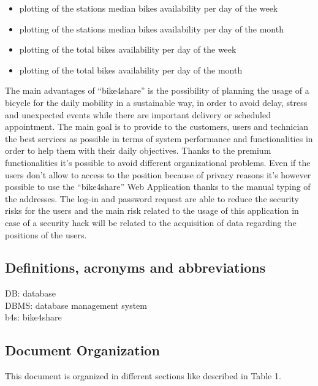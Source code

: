 \documentclass{article}
\begin{document}
\begin{itemize}
   \item plotting of the stations median bikes availability per day of the week
   \item plotting of the stations median bikes availability per day of the month
   \item plotting of the total bikes availability per day of the week 
   \item plotting of the total bikes availability per day of the month
\end{itemize}
The main advantages of “bike4share” is the possibility of planning the usage of a bicycle for the daily mobility in a sustainable way, in order to avoid delay, stress and unexpected events while there are important delivery or scheduled appointment.
The main goal is to provide to the customers, users and technician the best services as possible in terms of system performance and functionalities in order to help them with their daily objectives.
Thanks to the premium functionalities it’s possible to avoid different organizational problems. 
Even if the users don’t allow to access to the position because of privacy reasons it’s however possible to use the “bike4share” Web Application thanks to the manual typing of the addresses.  
The log-in and password request are able to reduce the security risks for the users and the main risk related to the usage of this application in case of a security hack will be related to the acquisition of data regarding the positions of the users.
\subsection{Definitions, acronyms and abbreviations}
DB: database\\
DBMS: database management system\\
b4s: bike4share 
\subsection{Document Organization}
This document is organized in different sections like described in Table 1.
\end{document}

